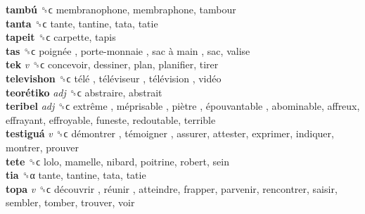 \textbf{tambú} ␝ϲ  membranophone, membraphone, tambour  \\
\textbf{tanta} ␝ϲ  tante, tantine, tata, tatie  \\
\textbf{tapeit} ␝ϲ  carpette, tapis  \\
\textbf{tas} ␝ϲ   poignée ,  porte-monnaie ,  sac à main , sac, valise  \\
\textbf{tek} \emph{v}  ␝ϲ  concevoir, dessiner, plan, planifier, tirer  \\
\textbf{televishon} ␝ϲ   télé ,  téléviseur ,  télévision ,  vidéo   \\
\textbf{teorétiko} \emph{adj}  ␝ϲ  abstraire, abstrait  \\
\textbf{teribel} \emph{adj}  ␝ϲ   extrême ,  méprisable ,  piètre ,  épouvantable , abominable, affreux, effrayant, effroyable, funeste, redoutable, terrible  \\
\textbf{testiguá} \emph{v}  ␝ϲ   démontrer ,  témoigner , assurer, attester, exprimer, indiquer, montrer, prouver  \\
\textbf{tete} ␝ϲ  lolo, mamelle, nibard, poitrine, robert, sein  \\
\textbf{tia} ␝α  tante, tantine, tata, tatie  \\
\textbf{topa} \emph{v}  ␝ϲ   découvrir ,  réunir , atteindre, frapper, parvenir, rencontrer, saisir, sembler, tomber, trouver, voir  \\
